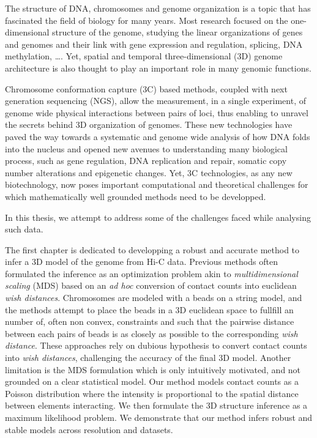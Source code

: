


\begin{abstracts}        %

The structure of DNA, chromosomes and genome organization is a topic that has
fascinated the field of biology for many years. Most research focused on the
one-dimensional structure of the genome, studying the linear organizations of
genes and genomes and their link with gene expression and regulation,
splicing, DNA methylation, \dots. Yet, spatial and temporal three-dimensional
(3D) genome architecture is also thought to play an important role in many
genomic functions.

Chromosome conformation capture (3C) based methods, coupled with next
generation sequencing (NGS), allow the measurement, in a single experiment, of
genome wide physical interactions between pairs of loci, thus enabling to
unravel the secrets behind 3D organization of genomes. These new technologies
have paved the way towards a systematic and genome wide analysis of how DNA
folds into the nucleus and opened new avenues to understanding many biological
process, such as gene regulation, DNA replication and repair, somatic copy
number alterations and epigenetic changes. Yet, 3C technologies, as any new
biotechnology, now poses important computational and theoretical challenges
for which mathematically well grounded methods need to be developped.

In this thesis, we attempt to address some of the challenges faced while
analysing such data.

The first chapter is dedicated to developping a robust and accurate method to
infer a 3D model of the genome from Hi-C data. Previous methods often
formulated the inference as an optimization problem akin to {\em
multidimensional scaling } (MDS) based on an {\em ad hoc} conversion of
contact counts into euclidean {\em wish distances}. Chromosomes are
modeled with a beads
on a string model, and the methods attempt to place the beads in a 3D
euclidean space to fullfill an number of, often non convex, constraints and
such that the pairwise distance between each pairs of beads is as closely
as possible to the corresponding {\em wish distance}. These
approaches rely on dubious hypothesis to convert contact counts into {\em wish
distances}, challenging the accuracy of the final 3D model. Another limitation
is the MDS formulation which is only intuitively motivated, and not grounded
on a clear statistical model. Our method models contact counts as a Poisson
distribution where the intensity is proportional to the spatial distance
between elements interacting. We then formulate the 3D structure inference as
a maximum likelihood problem. We demonstrate that our method infers robust and
stable models across resolution and datasets.


\end{abstracts}
